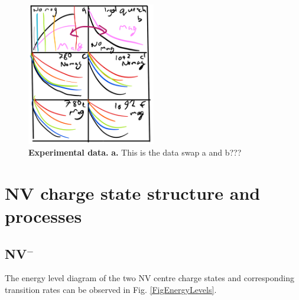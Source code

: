 \documentclass[preprint,prl]{revtex4}
\begin{document}
\begin{figure}[H]
  \centering
  \includegraphics[width=0.5\textwidth]{Data.png} 
 \caption{\textbf{Experimental data.} \textbf{a.} This is the data swap a and b???} \label{FigData}
\end{figure}


\section{NV charge state structure and processes}
\subsection{NV$^-$}
The energy level diagram of the two NV centre charge states and corresponding transition rates can be observed in Fig. \ref{FigEnergyLevels}.
\end{document}
